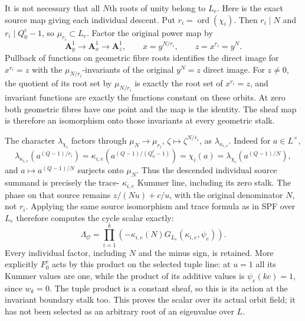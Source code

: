 It is not necessary that all \(N\)th roots of unity
belong to \(L_e\). Here is the exact source map
giving each individual descent. Put
\(r_i=\operatorname{ord}(\chi_i)\). Then
\(r_i\mid N\) and \(r_i\mid Q_0^e-1\), so
\(\mu_{r_i}\subset L_e\). Factor the original
power map by
\[
 \mathbf A^1_y\longrightarrow\mathbf A^1_x
       \longrightarrow\mathbf A^1_z,\qquad
 x=y^{N/r_i},\qquad z=x^{r_i}=y^N .
\]
Pullback of functions on geometric fibre roots
identifies the direct image for \(x^{r_i}=z\)
with the \(\mu_{N/r_i}\)-invariants of the
original \(y^N=z\) direct image. For \(z\ne0\),
the quotient of its root set by
\(\mu_{N/r_i}\) is exactly the root set of
\(x^{r_i}=z\), and invariant functions are
exactly the functions constant on these
orbits. At zero both geometric fibres have
one point and the map is the identity.
The sheaf map is therefore an isomorphism
onto those invariants at every geometric stalk.

The character \(\lambda_{\chi_i}\) factors
through \(\mu_N\to\mu_{r_i}\),
\(\zeta\mapsto\zeta^{N/r_i}\), as
\(\lambda_{\kappa_{i,e}}\). Indeed for
\(a\in L^\times\),
\[
 \lambda_{\kappa_{i,e}}(a^{(Q-1)/r_i})
   =\kappa_{i,e}(a^{(Q-1)/(Q_0^e-1)})
   =\chi_i(a)
   =\lambda_{\chi_i}(a^{(Q-1)/N}),
\]
and \(a\mapsto a^{(Q-1)/N}\) surjects onto
\(\mu_N\). Thus the descended individual
source summand is precisely the trace-
\(\kappa_{i,e}\) Kummer line, including
its zero stalk. The phase on that source
remains \(z/(Nu)+c/u\), with the original
denominator \(N\), not \(r_i\).
Applying the same source isomorphism and
trace formula as in SPF over \(L_e\)
therefore computes the cycle scalar exactly:
\[
 \Lambda_{\mathcal O}
   =\prod_{i=1}^k\left(
        -\kappa_{i,e}(N)G_{L_e}(\kappa_{i,e},\psi_e)\right).
 \tag{TPF.30}\label{eq:TPF30}
\]
Every individual factor, including \(N\) and the minus
sign, is retained. More explicitly \(F_0^e\) acts
by this product on the selected tuple line: at
\(u=1\) all its Kummer values are one, while
the product of its additive values is
\(\psi_e(kc)=1\), since \(w_k=0\).
The tuple product is a constant sheaf, so this
is its action at the invariant boundary stalk too.
This proves the scalar over its actual orbit
field; it has not been selected as an arbitrary
root of an eigenvalue over \(L\).

